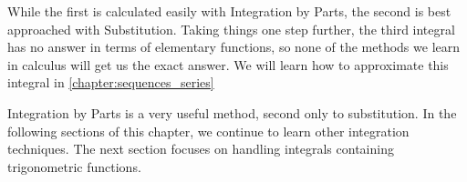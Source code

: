 While the first is calculated easily with Integration by Parts, the second is best approached with Substitution.  Taking things one step further, the third integral has no answer in terms of elementary functions, so none of the methods we learn in calculus will get us the exact answer.  We will learn how to approximate this integral in \autoref{chapter:sequences_series}

Integration by Parts is a very useful method, second only to substitution. In the following sections of this chapter, we continue to learn other integration techniques. The next section focuses on handling integrals containing trigonometric functions.





